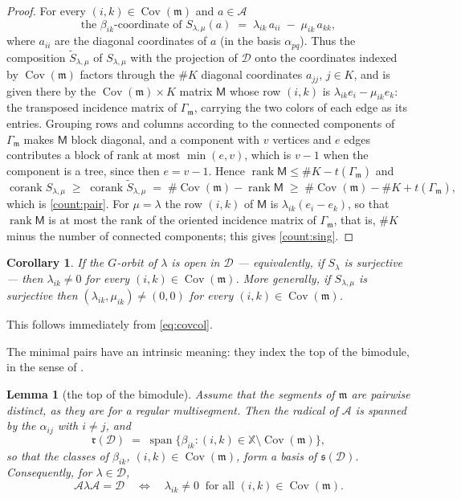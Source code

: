 \documentclass[12pt]{article}
\newtheorem{lemma}[lemma]{Lemma}
\newtheorem{corollary}[corollary]{Corollary}
\theoremstyle{definition}
\newcommand{\topp}{\mathfrak{s}}
\newcommand{\rbm}{\mathfrak{r}}  %
\newcommand{\mm}{\mathfrak{m}}
\newcommand{\alg}{\mathcal{A}}   %
\newcommand{\bmdl}{\mathcal{D}}   %
\newcommand{\XX}{\mathbb{X}}  %
\newcommand{\Kk}{K}         %
\newcommand{\algbss}{\alpha}     %
\newcommand{\bmdlbss}{\beta}    %
\newcommand{\Sop}{S}
\newcommand{\rank}{\operatorname{rank}}
\newcommand{\cork}{\operatorname{corank}}
\newcommand{\Span}{\operatorname{span}}
\newcommand{\Cov}{\operatorname{Cov}}  %
\newcommand{\acyc}{t}                     %
\newcommand{\cgr}{\Gamma}                 %
\begin{document}
\begin{proof}
For every $(i,k) \in \Cov(\mm)$ and $a\in\alg$
\begin{equation}\label{eq:covcol}
   \text{the $\bmdlbss_{ik}$-coordinate of } \Sop_{\lambda,\mu}(a)
   \;=\; \lambda_{ik}\,a_{ii} \;-\; \mu_{ik}\,a_{kk} ,
\end{equation}
where $a_{ii}$ are the diagonal coordinates of $a$ (in the basis $\algbss_{pq}$).
Thus the composition $\tilde\Sop_{\lambda,\mu}$ of $\Sop_{\lambda,\mu}$ with the projection of $\bmdl$
onto the coordinates indexed by $\Cov(\mm)$ factors through the $\#\Kk$
diagonal coordinates $a_{jj}$, $j \in \Kk$, and is given there by the
$\Cov(\mm)\times\Kk$ matrix $\mathsf{M}$ whose row $(i,k)$ is $\lambda_{ik}e_i -
\mu_{ik}e_k$: the transposed incidence matrix of $\cgr_\mm$, carrying the
two colors of each edge as its entries. Grouping rows and columns
according to the connected components of $\cgr_\mm$ makes $\mathsf{M}$ block
diagonal, and a component with $v$ vertices and $e$ edges contributes a
block of rank at most $\min(e,v)$, which is $v-1$ when the component is a
tree, since then $e = v-1$. Hence $\rank \mathsf{M} \le \#\Kk - \acyc(\cgr_\mm)$ and
\[
   \cork \Sop_{\lambda,\mu} \;\ge\; \cork \tilde\Sop_{\lambda,\mu}
   \;=\; \#\Cov(\mm) - \rank \mathsf{M} \;\ge\;
   \#\Cov(\mm) - \#\Kk + \acyc(\cgr_\mm) ,
\]
which is \eqref{count:pair}. For $\mu = \lambda$ the row $(i,k)$ of $\mathsf{M}$ is
$\lambda_{ik}(e_i - e_k)$, so that $\rank \mathsf{M}$ is at most the rank of the
oriented incidence matrix of $\cgr_\mm$, that is, $\#\Kk$ minus the number of
connected components; this gives \eqref{count:sing}.
\end{proof}

\begin{corollary}\label{cor:gencov}
If the $G$-orbit of $\lambda$ is open in $\bmdl$ --- equivalently, if
$\Sop_\lambda$ is surjective --- then $\lambda_{ik} \ne 0$ for every
$(i,k) \in \Cov(\mm)$. More generally, if $\Sop_{\lambda,\mu}$ is
surjective then $(\lambda_{ik},\mu_{ik}) \ne (0,0)$ for every $(i,k) \in
\Cov(\mm)$.
\end{corollary}
This follows immediately from \eqref{eq:covcol}.

The minimal pairs have an intrinsic meaning: they index the top of the
bimodule, in the sense of .

\begin{lemma}[the top of the bimodule]\label{lem:top}
Assume that the segments of $\mm$ are pairwise distinct, as they are for a
regular multisegment. Then the radical of $\alg$ is spanned by the
$\algbss_{ij}$ with $i \ne j$, and
\begin{equation}\label{eq:top}
   \rbm(\bmdl) \;=\; \Span\{\bmdlbss_{ik} :
      (i,k) \in \XX\setminus\Cov(\mm)\} ,
\end{equation}
so that the classes of $\bmdlbss_{ik}$, $(i,k) \in \Cov(\mm)$, form a basis
of $\topp(\bmdl)$. Consequently, for $\lambda \in \bmdl$,
\begin{equation}\label{eq:gencrit}
   \alg\lambda\alg = \bmdl
   \quad\Longleftrightarrow\quad
   \lambda_{ik} \ne 0 \ \text{ for all } (i,k) \in \Cov(\mm) .
\end{equation}
\end{lemma}
\end{document}
